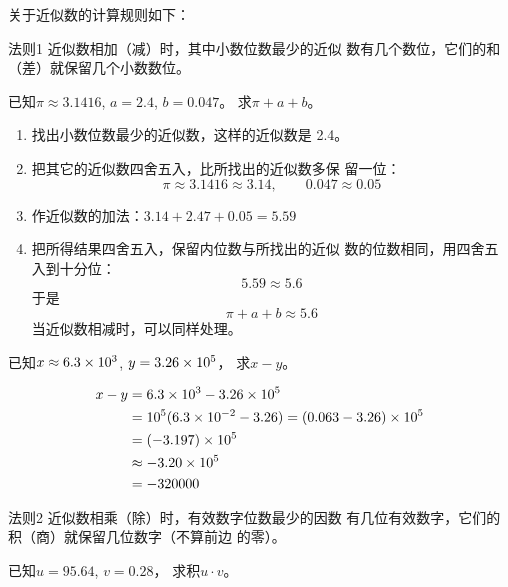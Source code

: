 关于近似数的计算规则如下：
\begin{blk}{法则1}
    近似数相加（减）时，其中小数位数最少的近似
    数有几个数位，它们的和（差）就保留几个小数数位。  
\end{blk}

\begin{example}
    已知$\pi\approx 3.1416$, $a=2.4$, $b=0.047$。
求$\pi+a+b$。
\end{example}    

\begin{solution}
\begin{enumerate}
\item 找出小数位数最少的近似数，这样的近似数是
    2.4。
    \item 把其它的近似数四舍五入，比所找出的近似数多保
    留一位：
    \[\pi\approx 3.1416\approx 3.14,\qquad 0.047\approx 0.05\]
    \item 作近似数的加法：$3.14+2.47+0.05=5.59$
    \item 把所得结果四舍五入，保留内位数与所找出的近似
    数的位数相同，用四舍五入到十分位：
    \[5.59\approx 5.6\]
    于是
    \[\pi+a+b\approx 5.6\]
    当近似数相减时，可以同样处理。
\end{enumerate}
\end{solution}

\begin{example}
已知$x\approx 6.3\times10^3$, $y=3.26\times10^5$，
求$x-y$。
\end{example}
    
    
\begin{solution}
\[\begin{split}
     x-y&=6.3\times10^3-3.26\times10^5\\
&=10^5(6.3\times10^{-2}-3.26)=(0.063-3.26)\times10^5\\
&=(-3.197)\times10^5\\
&\approx -3.20\times 10^5\\
&=-320000
\end{split}\]   
\end{solution}

\begin{blk}{法则2}
近似数相乘（除）时，有效数字位数最少的因数
有几位有效数字，它们的积（商）就保留几位数字（不算前边
的零）。
\end{blk}


\begin{example}
    已知$u=95.64$, $v=0.28$，
求积$u\cdot v$。
\end{example}


